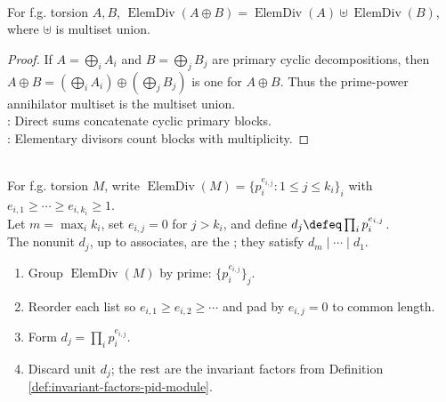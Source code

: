 \begin{proposition} \label{prop:elementary-divisors-direct-sums} \\
For f.g. torsion $A,B$, $\operatorname{ElemDiv}(A\oplus B)= \operatorname{ElemDiv}(A)\uplus\operatorname{ElemDiv}(B)$, where $\uplus$ is multiset union.
\begin{proof}
If $A=\bigoplus_i A_i$ and $B=\bigoplus_jB_j$ are primary cyclic decompositions, then $A\oplus B=(\bigoplus_i A_i)\oplus(\bigoplus_jB_j)$ is one for $A\oplus B$. Thus the prime-power annihilator multiset is the multiset union.\\
: Direct sums concatenate cyclic primary blocks.\\
: Elementary divisors count blocks with multiplicity.
\end{proof}
\end{proposition}

\begin{definition} \label{def:invariant-factors-pid-module} \\
For f.g. torsion $M$, write $\operatorname{ElemDiv}(M)=\{p_i^{e_{i,j}}:1\leq j\leq k_i\}_i$ with $e_{i,1}\geq\cdots\geq e_{i,k_i}\geq1$.\\
Let $m=\max_i k_i$, set $e_{i,j}=0$ for $j>k_i$, and define $d_j\defeq\prod_i p_i^{e_{i,j}}$.\\
The nonunit $d_j$, up to associates, are the ; they satisfy $d_m\mid\cdots\mid d_1$.
\end{definition}

\begin{method} \label{meth:elementary-divisors-to-invariant-factors} 
\begin{enumerate}[label=(\roman*)]
\setlength{\itemsep}{0pt}
\item Group $\operatorname{ElemDiv}(M)$ by prime: $\{p_i^{e_{i,j}}\}_j$.
\item Reorder each list so $e_{i,1}\geq e_{i,2}\geq\cdots$ and pad by
$e_{i,j}=0$ to common length.
\item Form $d_j=\prod_i p_i^{e_{i,j}}$.
\item Discard unit $d_j$; the rest are the invariant factors from Definition
\ref{def:invariant-factors-pid-module}.
\end{enumerate}
\end{method}

